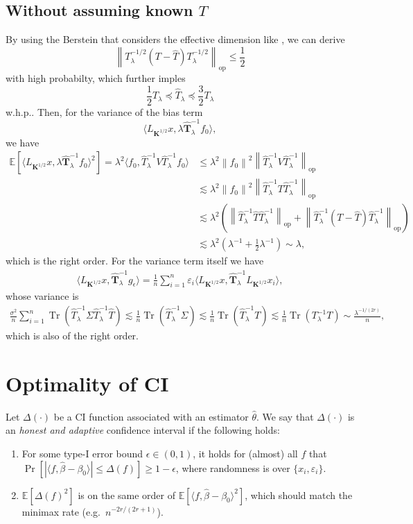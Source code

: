 \documentclass[11pt,a4paper]{article}
\DeclareMathOperator{\Tr}{Tr}
\newcommand{\norm}[1]{\left\|#1\right\|}
\renewcommand{\hat}{\widehat}
\theoremstyle{definition}
\theoremstyle{plain}
\theoremstyle{remark}
\newcommand{\op}{\mathrm{op}}
\begin{document}
\subsection{Without assuming known $T$}
By using the Berstein that considers the effective dimension like \cite{minsker2011some}, we can derive
\[\left\|T_{\lambda}^{-1/2}(T-\hat T)T_\lambda^{-1/2}\right\|_\op\leq \frac{1}{2}\]
with high probabilty, which further imples
\[\frac{1}{2}T_{\lambda}\preceq \hat{T}_{\lambda}\preceq \frac{3}{2}T_{\lambda}\]
w.h.p..
Then, for the variance of the bias term 
\[	\langle L_{\boldsymbol K^{1/2}}x, \lambda \hat{\boldsymbol{T}}_\lambda^{-1}f_0\rangle,\]
we have
\begin{align*}
	\mathbb{E}\left[\langle L_{\boldsymbol K^{1/2}}x, \lambda \hat{\boldsymbol{T}}_\lambda^{-1}f_0\rangle^2\right]=\lambda^2\langle f_0,\hat{T}_\lambda^{-1}V\hat T_{\lambda}^{-1}f_0\rangle&\leq\lambda^2\norm{f_0}^2\norm{\hat{T}_\lambda^{-1}V\hat T_{\lambda}^{-1}}_{\op}\\
	&\lesssim \lambda^2\norm{f_0}^2\norm{\hat{T}_\lambda^{-1}T\hat T_{\lambda}^{-1}}_{\op}\\
	&\lesssim\lambda^2\left(\norm{\hat{T}_\lambda^{-1}\hat T\hat T_{\lambda}^{-1}}_{\op}+\norm{\hat{T}_\lambda^{-1}(T-\hat T)\hat T_{\lambda}^{-1}}_{\op}\right)\\
	&\lesssim \lambda^2(\lambda^{-1}+\frac{1}{2}\lambda^{-1})\sim \lambda,
\end{align*}
which is the right order.
For the variance term itself we have
\begin{align*}
	\langle L_{\boldsymbol K^{1/2}}x,\hat{\boldsymbol T}_{\lambda}^{-1}g_\epsilon\rangle=\frac{1}{n}\sum_{i=1}^n \varepsilon_i\langle L_{\boldsymbol K^{1/2}}x,\hat{\boldsymbol T}_{\lambda}^{-1}L_{\boldsymbol K^{1/2}}x_i\rangle,
\end{align*}
whose variance is
\begin{align*}
\frac{\sigma^2}{n} \sum_{i=1}^n \Tr\left(\hat T_{\lambda}^{-1}\Sigma\hat T_{\lambda}^{-1}\hat T\right)\lesssim \frac{1}{n}\Tr\left(\hat T_{\lambda}^{-1}\Sigma\right)\lesssim\frac{1}{n}\Tr\left(\hat T_{\lambda}^{-1}T\right)\lesssim\frac{1}{n} \Tr\left(T_{\lambda}^{-1}T\right)\sim \frac{\lambda^{-1/(2r)}}{n},
\end{align*}
which is also of the right order.
\section{Optimality of CI}

Let $\Delta(\cdot)$ be a CI function associated with an estimator $\hat\theta$. We say that $\Delta(\cdot)$ is an \emph{honest and adaptive} confidence interval if the following holds:
\begin{enumerate}
\item For some type-I error bound $\epsilon\in(0,1)$, it holds for (almost) all $f$ that $\Pr[|\langle f,\hat\beta-\beta_0\rangle|\leq\Delta(f)] \geq 1-\epsilon$, where randomness is over $\{x_i,\varepsilon_i\}$.
\item $\mathbb E[\Delta(f)^2]$ is on the same order of $\mathbb E[\langle f,\hat\beta-\beta_0\rangle^2]$, which should match the minimax rate (e.g.~$n^{-2r/(2r+1)}$).
\end{enumerate}
\end{document}
